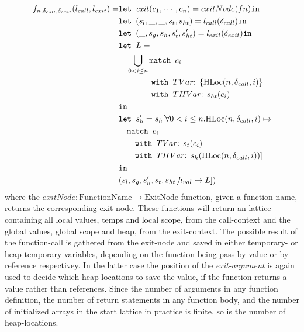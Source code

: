 \begin{align}
f_{n,\delta_{call}, \delta_{exit}}(l_{call}, l_{exit})=   &\texttt{let } \mathit{exit}(c_1, \cdots, c_n) = exitNode(fn) \texttt{in }\notag\\
                                                &\texttt{let } (s_l, \_, \_, s_t, s_{ht}) = l_{call}(\delta_{call}) \texttt{in }\notag\\
                                                &\texttt{let } (\_, s_g, s_h, s_t', s_{ht}') = l_{exit}(\delta_{exit}) \texttt{in }\notag\\
                                                &\texttt{let } L = \notag\\
                                                &\quad \bigcup_{0<i \leq n} \texttt{match }c_i\notag\\
                                                &\quad\quad\quad\quad \texttt{with }TVar\text{: } \{\text{HLoc}(n,\delta_{call}, i)\}\notag\\
                                                &\quad\quad\quad\quad \texttt{with }THVar\text{: } s_{ht}(c_i)\notag\\
                                                & \texttt{in }\notag\\
                                                &\texttt{let } s_h' = s_h[\forall 0 < i \leq n. \text{HLoc}(n,\delta_{call}, i) \mapsto\notag\\
                                                &\quad\texttt{match }c_i\notag\\
                                                &\quad\quad \texttt{with }TVar\text{: } s_t(c_i)\notag\\
                                                &\quad\quad \texttt{with }THVar\text{: } s_h(\text{HLoc}(n,\delta_{call}, i))]\notag\\
                                                & \texttt{in }\notag\\
                                                &(s_l,s_g,s_h', s_t, s_{ht}[h_{val}\mapsto L])
\end{align}
where the $exitNode : \text{FunctionName} \rightarrow \text{ExitNode}$ function, given a function name, returns the corresponding exit node. These functions will return an lattice containing all local values, temps and local scope, from the call-context and the global values, global scope and heap, from the exit-context. The possible result of the function-call is gathered from the exit-node and saved in either temporary- or heap-temporary-variables, depending on the function being pass by value or by reference respectivey. In the latter case the position of the \emph{exit-argument} is again used to decide which heap locations to save the value, if the function returns a value rather than references. Since the number of arguments  in any function definition, the number of return statements in any function body, and the number of initialized arrays in the start lattice in practice is finite, so is the number of heap-locations. 
